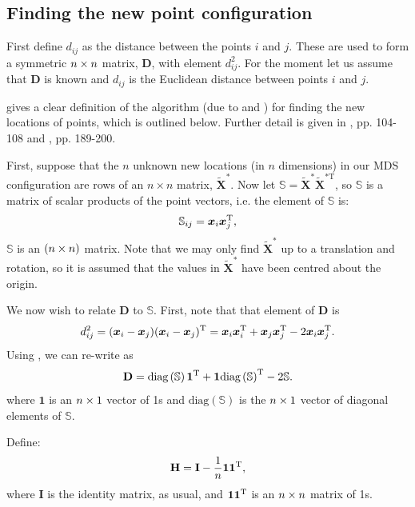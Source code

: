 \subsection{Finding the new point configuration}

First define $d_{ij}$ as the distance between the points $i$ and $j$. These are used to form a symmetric $n \times n$ matrix, $\mathbf{D}$, with \ijth element $d^2_{ij}$. For the moment let us assume that $\mathbf{D}$ is known and $d_{ij}$ is the Euclidean distance between points $i$ and $j$. 

 gives a clear definition of the algorithm (due to \cite{schoenberg35} and \cite{torgerson}) for finding the new locations of points, which is outlined below. Further detail is given in \cite{principlesofMA}, pp. 104-108 and \cite{chatfieldcollins}, pp. 189-200.

First, suppose that the $n$ unknown new locations (in $n$ dimensions) in our MDS configuration are rows of an $n \times n$ matrix, $\tilde{\mathbf{X}}^*$. Now let $\mathbb{S}=\tilde{\mathbf{X}}^{*} \tilde{\mathbf{X}}^{*\text{T}} $, so $\mathbb{S}$ is a matrix of scalar products of the point vectors, i.e. the \ijth element of $\mathbb{S}$ is:
\begin{equation}
\mathbb{S}_{ij} = \bm{x}_i\bm{x}_j^{\text{T}},
\label{selem}
\end{equation}
$\mathbb{S}$ is an $(n\times n)$ matrix. Note that we may only find $\tilde{\mathbf{X}}^*$ up to a translation and rotation, so it is assumed that the values in $\tilde{\mathbf{X}}^*$ have been centred about the origin.

We now wish to relate $\mathbf{D}$ to $\mathbb{S}$. First, note that that \ijth element of $\mathbf{D}$ is 
\begin{equation}
d_{ij}^2 = (\bm{x}_i-\bm{x}_j)(\bm{x}_i-\bm{x}_j)^{\text{T}} = \bm{x}_i\bm{x}_i^{\text{T}} + \bm{x}_j\bm{x}_j^{\text{T}}  -2 \bm{x}_i\bm{x}_j^{\text{T}}.
\label{dij}
\end{equation}
Using , we can re-write  as
\begin{equation}
\mathbf{D}=\text{diag}\left(\mathbb{S}\right)\bm{1}^{\text{T}} + \bm{1}\text{diag}\left(\mathbb{S}\right)^{\text{T}} -2\mathbb{S}.
\label{dijmat}
\end{equation}
where $\bm{1}$ is an $n \times 1$ vector of 1s and $\text{diag}\left(\mathbb{S}\right)$ is the $n \times 1$ vector of diagonal elements of $\mathbb{S}$.

Define:
\begin{equation}
\mathbf{H} = \mathbf{I}-\frac{1}{n}\bm{1}\bm{1}^{\text{T}},
\end{equation}
where $\mathbf{I}$ is the identity matrix, as usual, and $\bm{1}\bm{1}^{\text{T}}$ is an $n \times n$ matrix of 1s.


